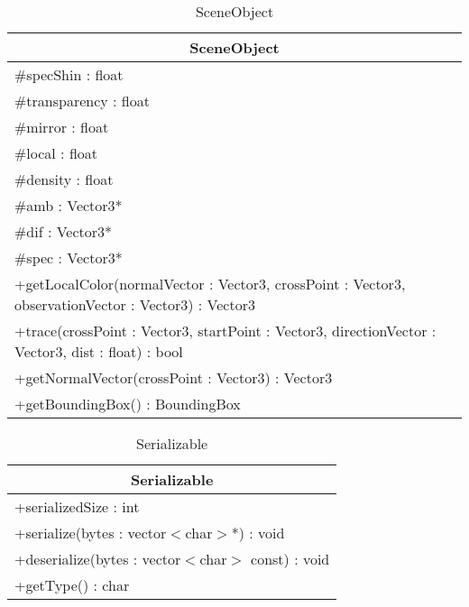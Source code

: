 \begin{longtable}{|p{16cm}|}
    \caption{SceneObject} \label{tab:SceneObject} \\ \hline
    \multicolumn{1}{|c|}{SceneObject} \\ \hline
    \#specShin : float \\
    \#transparency : float \\
    \#mirror : float \\
    \#local : float \\
    \#density : float \\
    \#amb : Vector3* \\
    \#dif : Vector3* \\
    \#spec : Vector3* \\
    \hline
	+getLocalColor(normalVector : Vector3, crossPoint : Vector3, observationVector : Vector3) : Vector3 \\
	+trace(crossPoint : Vector3, startPoint : Vector3, directionVector : Vector3, dist : float) : bool \\
	+getNormalVector(crossPoint : Vector3) : Vector3 \\
	+getBoundingBox() : BoundingBox \\
	\hline
\end{longtable}

\begin{longtable}{|p{16cm}|}
    \caption{Serializable} \label{tab:Serializable} \\ \hline
    \multicolumn{1}{|c|}{Serializable} \\ \hline
    +serializedSize : int \\ \hline
	+serialize(bytes : vector$<$char$>$*) : void \\ 
	+deserialize(bytes : vector$<$char$>$ const) : void \\
	+getType() : char \\
	\hline
\end{longtable}

